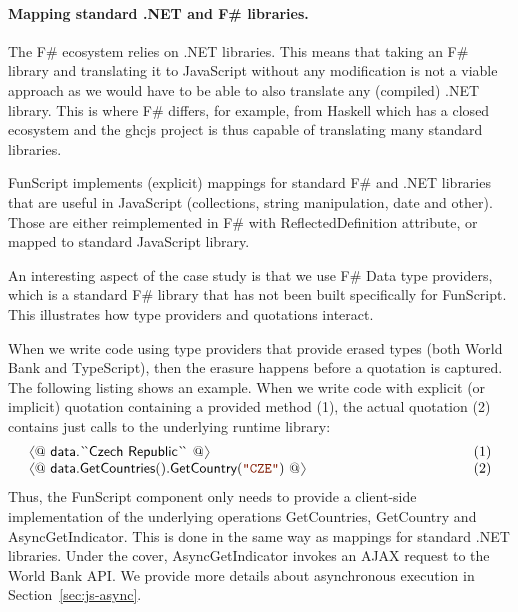 \documentclass[submission,copyright,creativecommons]{eptcs}
\newcommand{\langl}{\begin{picture}(4.5,7)
\put(1.1,2.5){\rotatebox{60}{\line(1,0){5.5}}}
\put(1.1,2.5){\rotatebox{300}{\line(1,0){5.5}}}
\end{picture}}
\newcommand{\rangl}{\begin{picture}(4.5,7)
\put(.9,2.5){\rotatebox{120}{\line(1,0){5.5}}}
\put(.9,2.5){\rotatebox{240}{\line(1,0){5.5}}}
\end{picture}}
\newcommand{\str}[1]{\textnormal{\textcolor{strclr}{\ttfamily "#1"}}}
\newcommand{\ident}[1]{\textnormal{\sffamily #1}}
\newcommand{\lident}[1]{\textnormal{\sffamily 
  \`{}\hspace{-0.25em}\`{}\hspace{-0.1em}#1\`{}\hspace{-0.25em}\`{}}}
\begin{document}
\paragraph{Mapping standard .NET and F\# libraries.}
The F\# ecosystem relies on .NET libraries. This means that taking an F\# library and translating it 
to JavaScript without any modification is not a viable approach as we would have to be able to also
translate any (compiled) .NET library. This is where F\# differs, for example, from Haskell which has
a closed ecosystem and the ghcjs project \cite{haskell-ghcjs} is thus capable of translating many 
standard libraries.

FunScript implements (explicit) mappings for standard F\# and .NET libraries that are useful in 
JavaScript (collections, string manipulation, date and other). Those are either reimplemented in
F\# with \ident{ReflectedDefinition} attribute, or mapped to standard JavaScript library.

An interesting aspect of the case study is that we use F\# Data \cite{fsharp-data} type providers, 
which is a standard F\# library that has not been built specifically for FunScript. This illustrates 
how type providers and quotations interact. 

When we write code using type providers that provide erased types (both World Bank and TypeScript), 
then the erasure happens before a quotation is captured. The following listing shows an example. 
When we write code with explicit (or implicit) quotation containing a provided method (1), the actual 
quotation (2) contains just calls to the underlying runtime library:
%
\begin{equation*}
\begin{array}{llr}
 \langl @~\ident{data.}\lident{Czech Republic}~@\rangl &\hspace{10em}& (1)\\
 \langl @~\ident{data.GetCountries}().\ident{GetCountry}(\str{CZE}) ~@\rangl  && (2)
\end{array}
\end{equation*}
%
Thus, the FunScript component only needs to provide a client-side implementation of the underlying
operations \ident{GetCountries}, \ident{GetCountry} and \ident{AsyncGetIndicator}. This is done in the
same way as mappings for standard .NET libraries. Under the cover, \ident{AsyncGetIndicator} invokes
an AJAX request to the World Bank API. We provide more details about asynchronous execution in 
Section~\ref{sec:js-async}.
\end{document}
